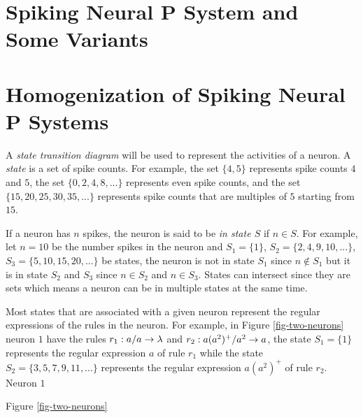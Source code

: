 \documentclass[runningheads,a4paper]{llncs}
\begin{document}
\section{Spiking Neural P System and Some Variants} \label{sec-snps}



\section{Homogenization of Spiking Neural P Systems} \label{sec-homo}

A \emph{state transition diagram} will be used to represent the activities of a neuron. 
A \emph{state} is a set of spike counts. For example, the set $\{4,5\}$ represents spike counts 
$4$ and $5$, the set $\{0,2,4,8,...\}$ represents even spike counts, and the set 
$\{15,20,25,30,35,...\}$ represents spike counts that are multiples of $5$ starting from $15$. 

If a neuron has $n$ spikes, the neuron is said to be \emph{in state $S$} if $n \in S$. For example, 
let $n=10$ be the number spikes in the neuron and $S_1=\{1\}$, $S_2=\{2,4,9,10,...\}$, 
$S_3=\{5,10,15,20,...\}$ be states, the neuron is not in state $S_1$ since $n \notin S_1$ but it is
in state $S_2$ and $S_3$ since $n \in S_2$ and $n \in S_3$. States can intersect since they are 
sets which means a neuron can be in multiple states at the same time. 

Most states that are associated with a given neuron represent the regular expressions of the rules
in the neuron. For example, in Figure \ref{fig-two-neurons} neuron $1$ have the rules $r_1: a/a \rightarrow \lambda$ and  
$r_2: a(a^2)^+/a^2 \rightarrow a$, the state $S_1=\{1\}$ represents the regular expression $a$ of rule $r_1$ 
while the state $S_2=\{3,5,7,9,11,...\}$ represents the regular expression $a(a^2)^+$ of rule $r_2$.
Neuron $1$  
 
                                                                                                
Figure \ref{fig-two-neurons}
\end{document}
